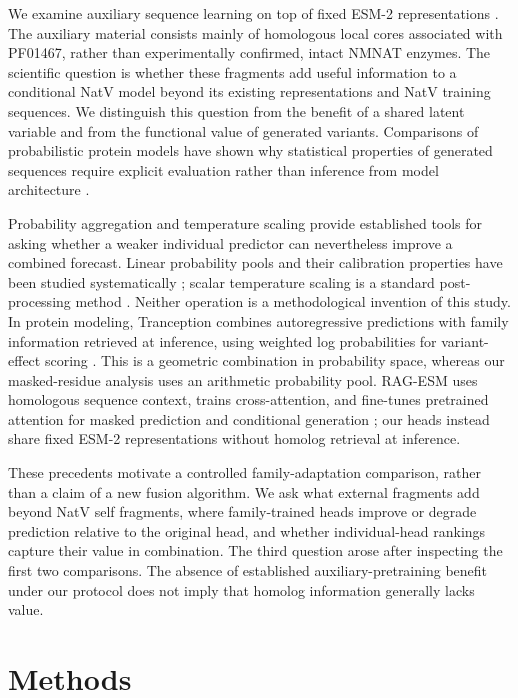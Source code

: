 \documentclass[referee,pdflatex,sn-vancouver-num]{sn-jnl}
\begin{document}
We examine auxiliary sequence learning on top of fixed ESM-2 representations \cite{lin2023}. The auxiliary material consists mainly of homologous local cores associated with PF01467, rather than experimentally confirmed, intact NMNAT enzymes. The scientific question is whether these fragments add useful information to a conditional NatV model beyond its existing representations and NatV training sequences. We distinguish this question from the benefit of a shared latent variable and from the functional value of generated variants. Comparisons of probabilistic protein models have shown why statistical properties of generated sequences require explicit evaluation rather than inference from model architecture \cite{mcgee2021}.

Probability aggregation and temperature scaling provide established tools for asking whether a weaker individual predictor can nevertheless improve a combined forecast. Linear probability pools and their calibration properties have been studied systematically \cite{gneiting2013}; scalar temperature scaling is a standard post-processing method \cite{guo2017}. Neither operation is a methodological invention of this study. In protein modeling, Tranception combines autoregressive predictions with family information retrieved at inference, using weighted log probabilities for variant-effect scoring \cite{notin2022}. This is a geometric combination in probability space, whereas our masked-residue analysis uses an arithmetic probability pool. RAG-ESM uses homologous sequence context, trains cross-attention, and fine-tunes pretrained attention for masked prediction and conditional generation \cite{sgarbossa2025}; our heads instead share fixed ESM-2 representations without homolog retrieval at inference.

These precedents motivate a controlled family-adaptation comparison, rather than a claim of a new fusion algorithm. We ask what external fragments add beyond NatV self fragments, where family-trained heads improve or degrade prediction relative to the original head, and whether individual-head rankings capture their value in combination. The third question arose after inspecting the first two comparisons. The absence of established auxiliary-pretraining benefit under our protocol does not imply that homolog information generally lacks value.

\section{Methods}
\end{document}

